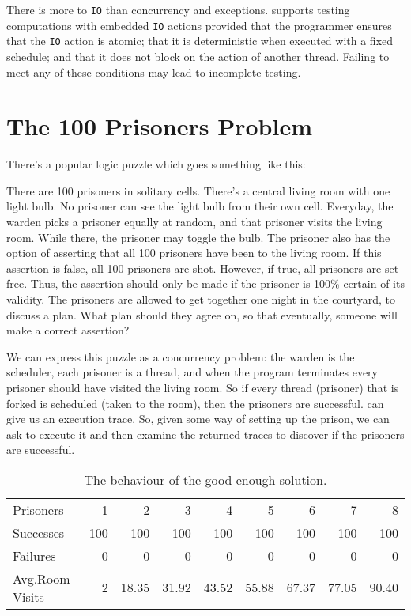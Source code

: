 There is more to \verb|IO| than concurrency and exceptions.  \dejafu{} supports
testing computations with embedded \verb|IO| actions provided that the
programmer ensures that the \verb|IO| action is atomic; that it is deterministic
when executed with a fixed schedule; and that it does not block on the action of
another thread.  Failing to meet any of these conditions may lead to incomplete
testing.

\section{The 100 Prisoners Problem}
\label{sec:dejafu-100}

There's a popular logic puzzle which goes something like this:

\begin{displayquote}
  There are 100 prisoners in solitary cells.  There's a central living
  room with one light bulb.  No prisoner can see the light bulb from
  their own cell.  Everyday, the warden picks a prisoner equally at
  random, and that prisoner visits the living room.  While there, the
  prisoner may toggle the bulb.  The prisoner also has the option of
  asserting that all 100 prisoners have been to the living room.  If
  this assertion is false, all 100 prisoners are shot.  However, if
  true, all prisoners are set free.  Thus, the assertion should only
  be made if the prisoner is 100\% certain of its validity.  The
  prisoners are allowed to get together one night in the courtyard, to
  discuss a plan.  What plan should they agree on, so that eventually,
  someone will make a correct assertion?
\end{displayquote}

We can express this puzzle as a concurrency problem: the warden is the
scheduler, each prisoner is a thread, and when the program terminates
every prisoner should have visited the living room.  So if every
thread (prisoner) that is forked is scheduled (taken to the room),
then the prisoners are successful.  \dejafu{} can give us an execution
trace.  So, given some way of setting up the prison, we can ask
\dejafu{} to execute it and then examine the returned traces to
discover if the prisoners are successful.

\begin{table}[t]
  \centering
  \begin{tabular}{l|rrrrrrrr} \toprule
    Prisoners          &   1 &   2    &   3    &   4    &   5    &   6    &   7    &   8 \\
    Successes          & 100 & 100    & 100    & 100    & 100    & 100    & 100    & 100 \\
    Failures           &   0 &   0    &   0    &   0    &   0    &   0    &   0    &   0 \\
    Avg.\@ Room Visits &   2 &  18.35 &  31.92 &  43.52 &  55.88 &  67.37 &  77.05 &  90.40 \\ \bottomrule
  \end{tabular}
  \caption{The behaviour of the good enough solution.}\label{tbl:100rand}
\end{table}

